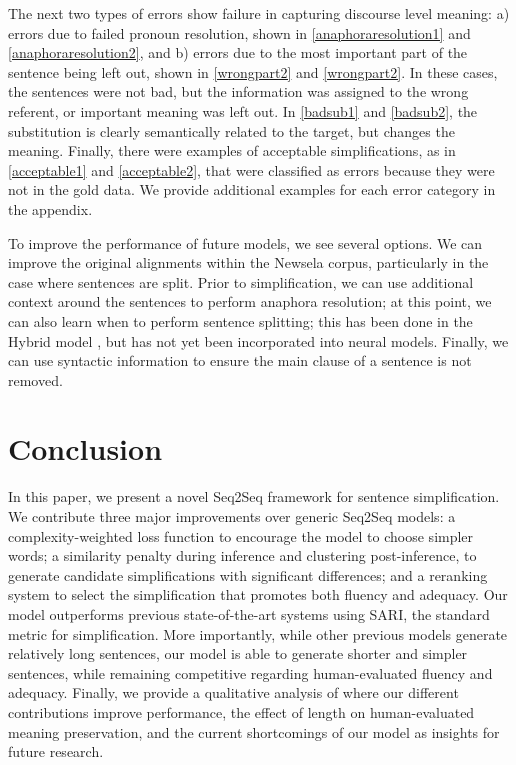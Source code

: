 \documentclass[11pt,a4paper]{article}
\begin{document}
The next two types of errors show failure in capturing discourse level meaning: a) errors due to failed pronoun resolution, shown in \ref{anaphoraresolution1} and \ref{anaphoraresolution2}, and b) errors due to the most important part of the sentence being left out, shown in \ref{wrongpart2} and \ref{wrongpart2}. In these cases, the sentences were not bad, but the information was assigned to the wrong referent, or important meaning was left out. In \ref{badsub1} and \ref{badsub2}, the substitution is clearly semantically related to the target, but changes the meaning. Finally, there were examples of acceptable simplifications, as in \ref{acceptable1} and \ref{acceptable2}, that were classified as errors because they were not in the gold data. We provide additional examples for each error category in the appendix.

To improve the performance of future models, we see several options. We can improve the original alignments within the Newsela corpus, particularly in the case where sentences are split. Prior to simplification, we can use additional context around the sentences to perform anaphora resolution; at this point, we can also learn when to perform sentence splitting; this has been done in the Hybrid model \cite{narayan2014hybrid}, but has not yet been incorporated into neural models. Finally, we can use syntactic information to ensure the main clause of a sentence is not removed.

\section{Conclusion}

In this paper, we present a novel Seq2Seq framework for sentence simplification. We contribute three major improvements over generic Seq2Seq models: a complexity-weighted loss function to encourage the model to choose simpler words; a similarity penalty during inference and clustering post-inference, to generate candidate simplifications with significant differences; and a reranking system to select the simplification that promotes both fluency and adequacy. Our model outperforms previous state-of-the-art systems using SARI, the standard metric for simplification. More importantly, while other previous models generate relatively long sentences, our model is able to generate shorter and simpler sentences, while remaining competitive regarding human-evaluated fluency and adequacy. Finally, we provide a qualitative analysis of where our different contributions improve performance, the effect of length on human-evaluated meaning preservation, and the current shortcomings of our model as insights for future research. 
\end{document}

